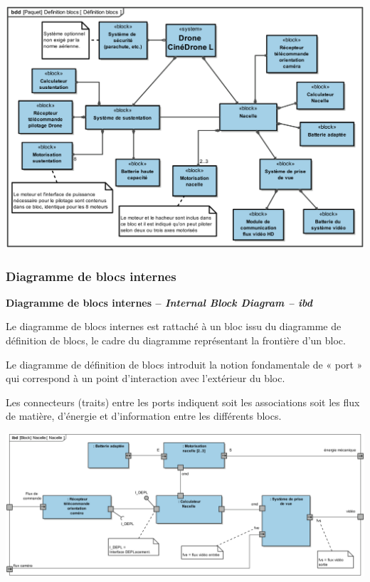 \documentclass[11pt,oneside]{article}
\begin{document}
\begin{exemple}
\begin{center}
\includegraphics[width=.5\textwidth]{png/PNG/SysML_Drone_Bdd}
\end{center}
\end{exemple}

\subsubsection{Diagramme de blocs internes}

\begin{defi}
\textbf{Diagramme de blocs internes -- \textit{Internal Block Diagram -- ibd}}

Le diagramme de blocs internes est rattaché à un bloc issu du diagramme de définition de
blocs, le cadre du diagramme représentant la frontière d’un bloc.

Le diagramme de définition de blocs introduit la notion fondamentale de « port » qui
correspond à un point d’interaction avec l’extérieur du bloc.

Les connecteurs (traits) entre les ports indiquent soit les associations soit les flux de matière,
d’énergie et d’information entre les différents blocs.

\end{defi}
 
\begin{exemple}
\begin{center}
\includegraphics[width=.9\textwidth]{png/PNG/SysML_Drone_ibd}
\end{center}
\end{exemple}
\end{document}
